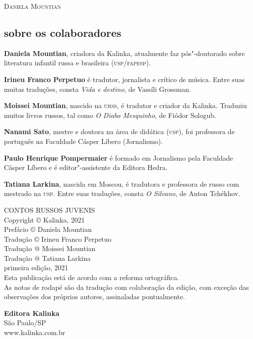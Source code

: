 \bigskip

\noindent\textsc{Daniela Mountian}

\subsection{sobre os colaboradores}

{\tiny
\noindent\textbf{Daniela Mountian}, criadora da Kalinka, atualmente faz pós"-doutorado sobre literatura infantil russa e brasileira (\textsc{usp/fapesp}).

\noindent{}

\noindent\textbf{Irineu Franco Perpetuo} é tradutor, jornalista e crítico de música. Entre suas muitas traduções, consta \textit{Vida e destino}, de Vassíli Grossman.

\noindent\textbf{Moissei Mountian}, nascido na \textsc{urss}, é tradutor e criador da Kalinka. Traduziu muitos livros russos, tal como \textit{O Diabo Mesquinho}, de Fiódor Sologub.

\noindent\textbf{Nanami Sato}, mestre e doutora na área de didática (\textsc{usp}), foi professora de português na Faculdade Cásper Líbero (Jornalismo).

\noindent\textbf{Paulo Henrique Pompermaier} é formado em Jornalismo pela Faculdade Cásper Líbero e é editor"-assistente da Editora Hedra.

\noindent\textbf{Tatiana Larkina}, nascida em Moscou, é tradutora e professora de russo com mestrado na \textsc{usp}. Entre suas traduções, consta \textit{O Silvano}, de Anton Tchékhov.
}

\endgroup

\pagebreak
\thispagestyle{empty}
\movetooddpage
\thispagestyle{empty}

\begingroup\footnotesize

\vspace*{\fill}
\begin{flushright}
CONTOS RUSSOS JUVENIS\\[6pt]
Copyright © Kalinka, 2021\\[6pt]
Prefácio © Daniela Mountian\\[6pt]
Tradução © Irineu Franco Perpetuo\\[6pt]
Tradução @ Moissei Mountian\\[6pt]
Tradução @ Tatiana Larkina\\[20pt]

primeira edição, 2021\\[20pt]

Esta publicação está de acordo com a reforma ortográfica.\\[6pt]

As notas de rodapé são da tradução com colaboração da edição, com exceção das observações dos próprios autores, assinaladas pontualmente.\\[6pt]
\end{flushright}
\vspace*{\fill}

\vfill


\begin{flushright}
\textbf{Editora Kalinka}\\
São Paulo/SP\\
www.kalinka.com.br
\end{flushright}

\endgroup
